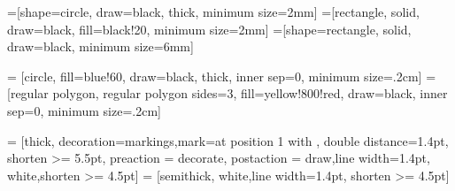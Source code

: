 


\graphicspath{{img/}{../img/}{../../../share/img/}}

\usepackage{pdfpages}
\usepackage{tikz}


%
=[shape=circle, draw=black, thick, minimum size=2mm]
=[rectangle, solid, draw=black, fill=black!20, minimum size=2mm]
=[shape=rectangle, solid, draw=black, minimum size=6mm]

 = [circle, fill=blue!60, draw=black, thick, inner sep=0, minimum size=.2cm]
 = [regular polygon, regular polygon sides=3, fill=yellow!800!red, draw=black, inner sep=0, minimum size=.2cm]

 = [thick, decoration={markings,mark=at position
   1 with {}},
   double distance=1.4pt, shorten >= 5.5pt,
   preaction = {decorate},
   postaction = {draw,line width=1.4pt, white,shorten >= 4.5pt}]
 = [semithick, white,line width=1.4pt, shorten >= 4.5pt]



\usetikzlibrary{chains}
\usetikzlibrary{calc}
\usetikzlibrary{matrix}




